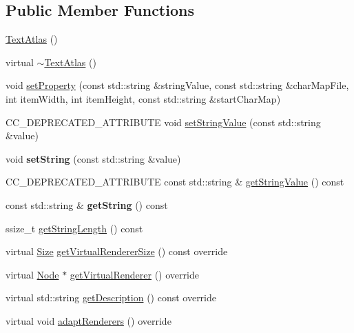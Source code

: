 \subsection*{Public Member Functions}
\begin{DoxyCompactItemize}
\item 
\hyperlink{classui_1_1TextAtlas_a10e8abf999ff03704e3d8ba2f44487d2}{Text\+Atlas} ()
\item 
virtual \hyperlink{classui_1_1TextAtlas_aaa00c4190478e73c2afea9ed72e87f5e}{$\sim$\+Text\+Atlas} ()
\item 
void \hyperlink{classui_1_1TextAtlas_a7d6ab98bd8279a893f304205964401dd}{set\+Property} (const std\+::string \&string\+Value, const std\+::string \&char\+Map\+File, int item\+Width, int item\+Height, const std\+::string \&start\+Char\+Map)
\item 
C\+C\+\_\+\+D\+E\+P\+R\+E\+C\+A\+T\+E\+D\+\_\+\+A\+T\+T\+R\+I\+B\+U\+TE void \hyperlink{classui_1_1TextAtlas_af0f33051246221a59b0127462f5b9ab4}{set\+String\+Value} (const std\+::string \&value)
\item 
\mbox{\label{classui_1_1TextAtlas_a80b1969ff0cc993876021ef4f3f98b68}} 
void {\bfseries set\+String} (const std\+::string \&value)
\item 
C\+C\+\_\+\+D\+E\+P\+R\+E\+C\+A\+T\+E\+D\+\_\+\+A\+T\+T\+R\+I\+B\+U\+TE const std\+::string \& \hyperlink{classui_1_1TextAtlas_a02a1ddc7ce3e45c8591d051e6f1471c6}{get\+String\+Value} () const
\item 
\mbox{\label{classui_1_1TextAtlas_addc2aa584a7b3e538c8d168006afc5af}} 
const std\+::string \& {\bfseries get\+String} () const
\item 
ssize\+\_\+t \hyperlink{classui_1_1TextAtlas_abb16bab18d7e725fd0be9662a76d7e41}{get\+String\+Length} () const
\item 
virtual \hyperlink{classSize}{Size} \hyperlink{classui_1_1TextAtlas_a3ec9a3a40ad49b44807ef9e42bc6dd2f}{get\+Virtual\+Renderer\+Size} () const override
\item 
virtual \hyperlink{classNode}{Node} $\ast$ \hyperlink{classui_1_1TextAtlas_a7341add4e53083db9de33dd5ab7eb0bd}{get\+Virtual\+Renderer} () override
\item 
virtual std\+::string \hyperlink{classui_1_1TextAtlas_ab0cfaf71fb9b5e41c1d9cd8374a8a382}{get\+Description} () const override
\item 
virtual void \hyperlink{classui_1_1TextAtlas_a8197f84d1abe2f05752551cad33438aa}{adapt\+Renderers} () override

\end{DoxyCompactItemize}
